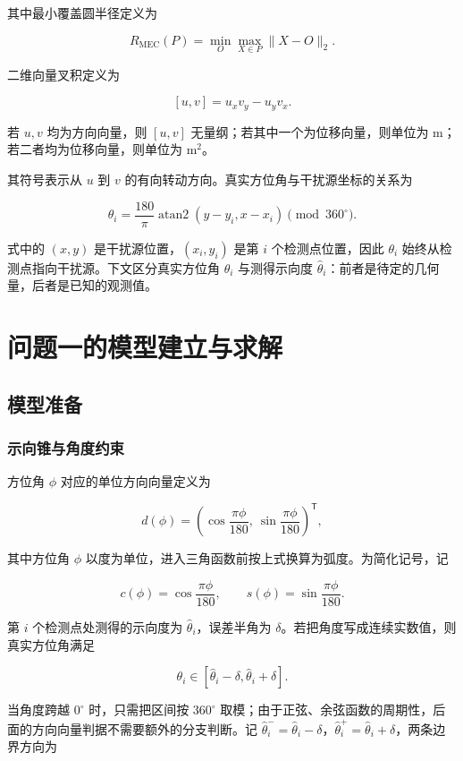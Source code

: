 其中最小覆盖圆半径定义为

\[
R_{\mathrm{MEC}}(P)=\min_{O}\max_{X\in P}\lVert X-O\rVert_2.
\]

二维向量叉积定义为

\[
[u,v]=u_xv_y-u_yv_x.
\]

若 $u,v$ 均为方向向量，则 $[u,v]$ 无量纲；若其中一个为位移向量，则单位为 $\mathrm{m}$；若二者均为位移向量，则单位为 $\mathrm{m^2}$。

其符号表示从 $u$ 到 $v$ 的有向转动方向。真实方位角与干扰源坐标的关系为

\[
\theta_i=\frac{180}{\pi}\operatorname{atan2}(y-y_i,x-x_i)\pmod{360^\circ}.
\]

式中的 $(x,y)$ 是干扰源位置，$(x_i,y_i)$ 是第 $i$ 个检测点位置，因此 $\theta_i$ 始终从检测点指向干扰源。下文区分真实方位角 $\theta_i$ 与测得示向度 $\hat\theta_i$：前者是待定的几何量，后者是已知的观测值。

\section{问题一的模型建立与求解}

\subsection{模型准备}

\subsubsection{示向锥与角度约束}

方位角 $\phi$ 对应的单位方向向量定义为

\[
d(\phi)=\left(\cos\frac{\pi\phi}{180},\ \sin\frac{\pi\phi}{180}\right)^{\mathsf T},
\]


其中方位角 $\phi$ 以度为单位，进入三角函数前按上式换算为弧度。为简化记号，记

\[
c(\phi)=\cos\frac{\pi\phi}{180},\qquad s(\phi)=\sin\frac{\pi\phi}{180}.
\]

第 $i$ 个检测点处测得的示向度为 $\hat\theta_i$，误差半角为 $\delta$。若把角度写成连续实数值，则真实方位角满足

\[
\theta_i\in[\hat\theta_i-\delta,\hat\theta_i+\delta].
\]

当角度跨越 $0^\circ$ 时，只需把区间按 $360^\circ$ 取模；由于正弦、余弦函数的周期性，后面的方向向量判据不需要额外的分支判断。记 $\hat\theta_i^-=\hat\theta_i-\delta$，$\hat\theta_i^+=\hat\theta_i+\delta$，两条边界方向为

